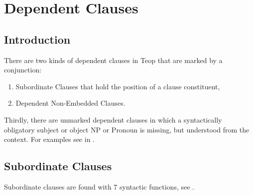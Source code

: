 \documentclass[output=paper]{langscibook}
\begin{document}
\section{Dependent Clauses}\label{sec:depclaus}
\subsection{Introduction}\label{sec:depclausintro}

There are two kinds of dependent clauses in Teop that are marked by a conjunction:

\begin{enumerate}
    \item Subordinate Clauses that hold the position of a clause constituent, 
    \item Dependent Non-Embedded Clauses. 
\end{enumerate}

Thirdly, there are unmarked dependent clauses in which a syntactically obligatory subject or object NP or Pronoun is missing, but understood from the context. For examples see  in .

\subsection{Subordinate Clauses}\label{sec:subordclaus}

Subordinate clauses are found with 7 syntactic functions, see .
\end{document}
